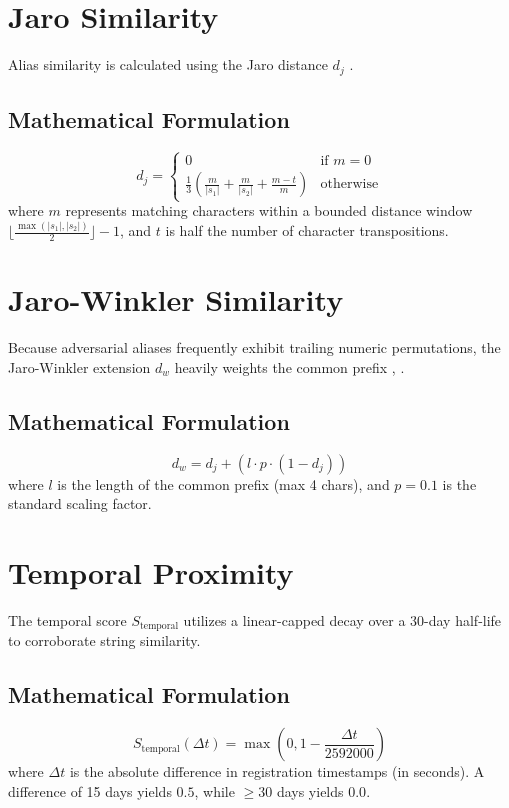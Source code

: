 \section{Jaro Similarity}
\label{sec:meth-jaro}
Alias similarity is calculated using the Jaro distance $d_j$ \cite{jaro1989advances}. 

\subsection{Mathematical Formulation}
\begin{equation}
d_j = \begin{cases} 
0 & \text{if } m = 0 \\
\frac{1}{3} \left( \frac{m}{|s_1|} + \frac{m}{|s_2|} + \frac{m - t}{m} \right) & \text{otherwise}
\end{cases}
\label{eq:jaro}
\end{equation}
where $m$ represents matching characters within a bounded distance window 
$\lfloor \frac{\max(|s_1|, |s_2|)}{2} \rfloor - 1$, and $t$ is half the number of character transpositions.

\section{Jaro-Winkler Similarity}
\label{sec:meth-jw}
Because adversarial aliases frequently exhibit trailing numeric permutations, the Jaro-Winkler 
extension $d_w$ heavily weights the common prefix \cite{winkler1990string}, \cite{cohen2003comparison}.

\subsection{Mathematical Formulation}
\begin{equation}
d_w = d_j + (l \cdot p \cdot (1 - d_j))
\label{eq:jaro-winkler}
\end{equation}
where $l$ is the length of the common prefix (max 4 chars), and $p = 0.1$ is the standard scaling factor.

\section{Temporal Proximity}
\label{sec:meth-temporal}
The temporal score $S_{\text{temporal}}$ utilizes a linear-capped decay over a 30-day half-life to 
corroborate string similarity.

\subsection{Mathematical Formulation}
\begin{equation}
S_{\text{temporal}}(\Delta t) = \max \left( 0, 1 - \frac{\Delta t}{2592000} \right)
\label{eq:temporal}
\end{equation}
where $\Delta t$ is the absolute difference in registration timestamps (in seconds). A difference 
of 15 days yields $0.5$, while $\ge 30$ days yields $0.0$.

